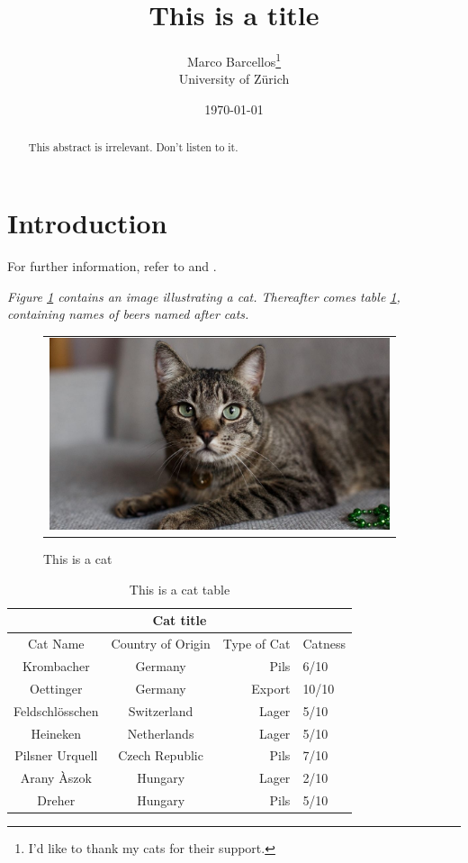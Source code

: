 \documentclass{article}
\begin{document}
\title{This is a title}
\author{Marco Barcellos\thanks{I'd like to thank my cats for their support.} \\ \normalsize{University of Zürich}}
\date{\today}
\maketitle
\begin{abstract}
This abstract is irrelevant. Don't listen to it.
\end{abstract}
\section{Introduction}
\Blindtext
For further information, refer to \cite{corona} and \cite{Tail}.
\par

\emph{Figure \ref{figure1} contains an image illustrating a cat. Thereafter comes table \ref{table:1}, containing names of beers named after cats.}
\newpage

	\begin{figure}[htb]\center 
		\begin{tabular}{c}
			\includegraphics[width = 10cm]{cat.jpg}
		\end{tabular}
		\caption{\footnotesize This is a cat}
		\label{figure1}
	\end{figure}


\begin{table}[h!]
\center
\begin{tabular}{ |c||c|r|l|  }
 \hline
 \multicolumn{4}{|c|}{Cat title} \\
 \hline
 Cat Name & Country of Origin &Type of Cat&Catness\\
 \hline
 Krombacher   & Germany    & Pils &   6/10\\
 Oettinger&   Germany  & Export   &10/10\\
 Feldschlösschen &Switzerland & Lager &  5/10\\
 Heineken    &Netherlands & Lager &  5/10\\
 Pilsner Urquell&   Czech Republic  & Pils & 7/10\\
 Arany Àszok& Hungary  & Lager   & 2/10\\
 Dreher& Hungary  & Pils & 5/10\\
 \hline
 \end{tabular}
 \caption{This is a cat table}
 \label{table:1}
\end{table}

\newpage

\printbibliography
\end{document}
